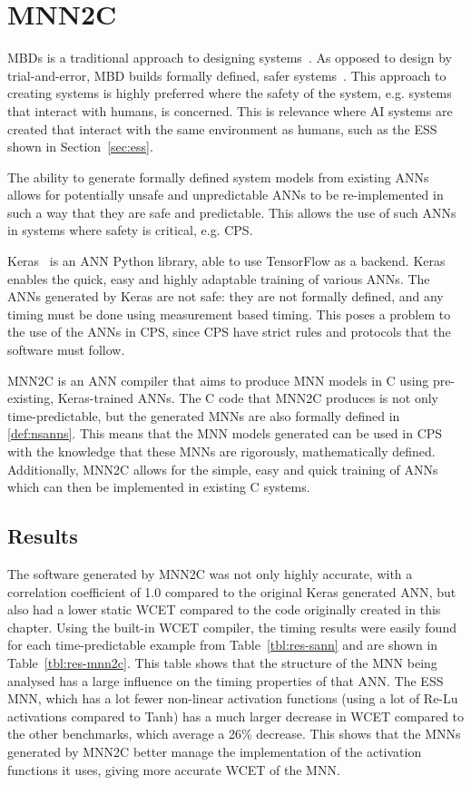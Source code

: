 \section{\acf{MNN2C}}
\label{sec:mnn2c}
\acfp{MBD} is a traditional approach to designing systems~\cite{dmd2019}.
As opposed to design by trial-and-error, \ac{MBD} builds formally defined, safer systems~\cite{dmd2019}.
This approach to creating systems is highly preferred where the safety of the system, e.g. systems that interact with humans, is concerned.
This is relevance where \ac{AI} systems are created that interact with the same environment as humans, such as the \acf{ESS} shown in Section~\ref{sec:ess}.

The ability to generate formally defined system models from existing \acp{ANN} allows for potentially unsafe and unpredictable \acp{ANN} to be re-implemented in such a way that they are safe and predictable.
This allows the use of such \acp{ANN} in systems where safety is critical, e.g. \acf{CPS}.

Keras~\cite{chollet2015keras} is an \ac{ANN} Python library, able to use TensorFlow as a backend. 
Keras enables the quick, easy and highly adaptable training of various \acp{ANN}.
The \acp{ANN} generated by Keras are not safe: they are not formally defined, and any timing must be done using measurement based timing. 
This poses a problem to the use of the \acp{ANN} in \ac{CPS}, since \ac{CPS} have strict rules and protocols that the software must follow.

\acf{MNN2C} is an \ac{ANN} compiler that aims to produce \acf{MNN} models in C using pre-existing, Keras-trained \acp{ANN}.
The C code that \ac{MNN2C} produces is not only time-predictable, but the generated \acp{MNN} are also formally defined in \ref{def:nsanns}.
This means that the \ac{MNN} models generated can be used in \ac{CPS} with the knowledge that these \acp{MNN} are rigorously, mathematically defined. 
Additionally, \ac{MNN2C} allows for the simple, easy and quick training of \acp{ANN} which can then be implemented in existing C systems.

\subsection{Results}
The software generated by \ac{MNN2C} was not only highly accurate, with a correlation coefficient of 1.0 compared to the original Keras generated \ac{ANN}, but also had a lower static \ac{WCET} compared to the code originally created in this chapter.
Using the built-in \ac{WCET} compiler, the timing results were easily found for each time-predictable example from Table~\ref{tbl:res-sann} and are shown in Table~\ref{tbl:res-mnn2c}.
This table shows that the structure of the \ac{MNN} being analysed has a large influence on the timing properties of that \ac{ANN}. 
The \ac{ESS} \ac{MNN}, which has a lot fewer non-linear activation functions (using a lot of Re-Lu activations compared to Tanh) has a much larger decrease in \ac{WCET} compared to the other benchmarks, which average a 26\% decrease.
This shows that the \acp{MNN} generated by \ac{MNN2C} better manage the implementation of the activation functions it uses, giving more accurate \ac{WCET} of the \ac{MNN}.

